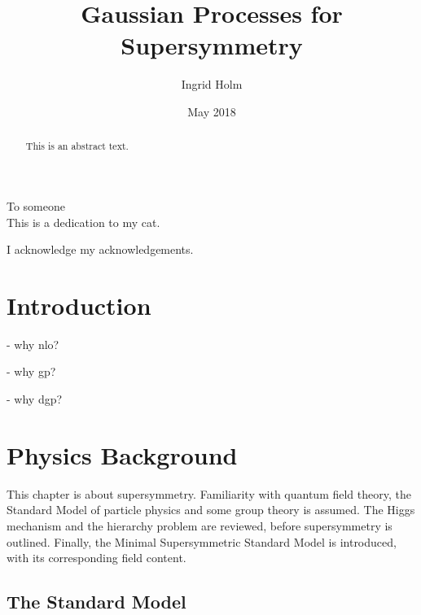 \documentclass[twoside,english]{uiofysmaster}
\begin{document}
\title{Gaussian Processes for Supersymmetry}
\author{Ingrid Holm}
\date{May 2018}

\maketitle

\begin{abstract}
This is an abstract text.
\end{abstract}

\begin{dedication}
  To someone
  \\\vspace{12pt}
  This is a dedication to my cat.
\end{dedication}

\begin{acknowledgements}
  I acknowledge my acknowledgements.
\end{acknowledgements}

\tableofcontents


\chapter{Introduction}

- why nlo?

- why gp?

- why dgp?

\chapter{Physics Background}



This chapter is about supersymmetry. Familiarity with quantum field theory, the Standard Model of particle physics and some group theory is assumed. The Higgs mechanism and the hierarchy problem are reviewed, before supersymmetry is outlined. Finally, the Minimal Supersymmetric Standard Model is introduced, with its corresponding field content.

\section{The Standard Model}
\end{document}
